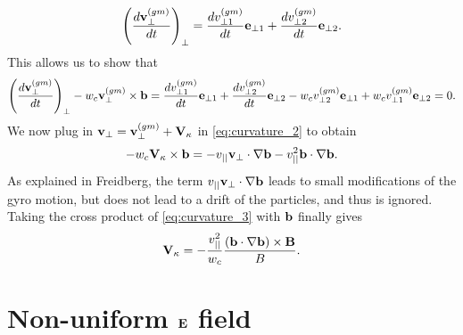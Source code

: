 \documentclass[oneside,a4paper,11pt]{report}
\begin{document}
\begin{equation}
    \left ( \frac{d \mathbf{v}_\perp^{(gm)}}{dt} \right)_\perp = \frac{dv^{(gm)}_{\perp1}}{dt} \mathbf{e}_{\perp1} + \frac{dv^{(gm)}_{\perp2}}{dt} \mathbf{e}_{\perp2}.
\end{equation}
This allows us to show that 
\begin{equation}
    \left ( \frac{d \mathbf{v}_\perp^{(gm)}}{dt} \right)_\perp - w_c \mathbf{v}_\perp^{(gm)} \times \mathbf{b} = \frac{dv^{(gm)}_{\perp1}}{dt} \mathbf{e}_{\perp1} + \frac{dv^{(gm)}_{\perp2}}{dt} \mathbf{e}_{\perp2} - w_c v^{(gm)}_{\perp2} \mathbf{e}_{\perp1} + w_c v^{(gm)}_{\perp1} \mathbf{e}_{\perp2} = 0.
\end{equation}
We now plug in $\mathbf{v}_\perp = \mathbf{v}_\perp^{(gm)} + \mathbf{V}_\kappa$ in \cref{eq:curvature_2} to obtain
\begin{equation}
\label{eq:curvature_3}
    -w_c \mathbf{V}_\kappa \times \mathbf{b} = - v_{||} \mathbf{v}_\perp \cdot \nabla \mathbf{b} - v_{||}^2 \mathbf{b} \cdot \nabla \mathbf{b}.
\end{equation}
As explained in Freidberg, the term $v_{||} \mathbf{v}_\perp \cdot \nabla \mathbf{b}$ leads to small modifications of the gyro motion, but does not lead to a drift of the particles, and thus is ignored. Taking the cross product of \cref{eq:curvature_3} with $\mathbf{b}$ finally gives
\begin{equation}
    \mathbf{V}_\kappa = - \frac{v_{||}^2}{w_c} \frac{( \mathbf{b} \cdot \nabla \mathbf{b} ) \times \mathbf{B}}{B}.
\end{equation}

\section{Non-uniform $\mathbf{E}$ field}

\end{document}
